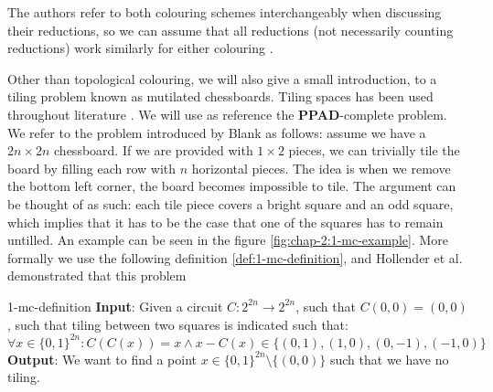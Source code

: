 The authors refer to both colouring schemes interchangeably when discussing their reductions,
so we can assume that all reductions (not necessarily counting reductions) work similarly for either colouring
\cite{chen_SettlingComplexityComputing_2009, deligkas_PureCircuitTightInapproximability_2024, daskalakis_ComplexityComputingNash_2006, chen_Complexity2DDiscrete_2009}.

Other than topological colouring, we will also give a small introduction, to a tiling problem known as mutilated chessboards. Tiling
spaces has been used throughout literature \cite{hollender_ComplexityMultisourceVariants_2018,chan_ComputationalComplexityCounting_2024}. %
We will use as reference the \textbf{PPAD}-complete  problem. We refer
to the problem introduced by Blank \cite{black1946critical} as follows:
assume we have a $2n \times 2n$ chessboard. If we are provided with $1 \times 2$ pieces, we can trivially tile the board by filling each row with $n$ horizontal
pieces. The idea is when we remove the bottom left corner, the board becomes impossible to tile. The argument
can be thought of as such: each tile piece covers a bright square and an odd square, which implies that it has to be the case that one of the squares
has to remain untilled. An example can be seen in the figure \ref{fig:chap-2:1-mc-example}. More formally we use the following definition \ref{def:1-mc-definition},
and Hollender et al. \cite{hollender_ComplexityMultisourceVariants_2018} demonstrated that this problem



\begin{definitionbox}{ \cite{hollender_ComplexityMultisourceVariants_2018}}{1-mc-definition}
    \label{def:1-mc-definition}
    \textbf{Input}: Given a circuit $C : 2^{2n} \to 2^{2n}$, such that $C(0,0) = (0,0)$, such that tiling between two
    squares is indicated such that:
    $$
        \forall x \in \{0,1\}^{2n} : C(C(x)) = x \wedge x - C(x) \in \{(0,1), (1,0), (0, -1), (-1, 0 )\}
    $$
    \textbf{Output}: We want to find a point $x \in \{0,1\}^{2n} \setminus \{(0,0)\}$ such that we have no tiling.
\end{definitionbox}

